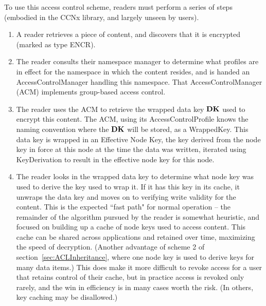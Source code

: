 To use this access control scheme, readers must perform a series of
steps (embodied in the CCNx library, and largely unseen by users).
\begin{enumerate}
\item A reader retrieves a piece of content, and discovers that it is encrypted (marked as type ENCR).

\item The reader consults their namespace manager to determine what
  profiles are in effect for the namespace in which the content
  resides, and is handed an AccessControlManager handling this
  namespace. That AccessControlManager (ACM) implements group-based
  access control.

\item The reader uses the ACM to retrieve the wrapped data key ${\textbf{DK}}$
  used to encrypt this content. The ACM, using its
  AccessControlProfile knows the naming convention where the ${\textbf{DK}}$
  will be stored, as a WrappedKey. This data key is wrapped in an
  Effective Node Key, the key derived from the node key in force at
  this node at the time the data was written, iterated using
  KeyDerivation to result in the effective node key for this node.

\item The reader looks in the wrapped data key to determine what node
  key was used to derive the key used to wrap it. If it has this key
  in its cache, it unwraps the data key and moves on to verifying
  write validity for the content. This is the expected ``fast path"
  for normal operation -- the remainder of the algorithm pursued by
  the reader is somewhat heuristic, and focused on building up a cache
  of node keys used to access content. This cache can be shared across
  applications and retained over time, maximizing the speed of
  decryption. (Another advantage of scheme 2 of
  section~\ref{sec:ACLInheritance}, where one node key is used to
  derive keys for many data items.) This does make it more difficult
  to revoke access for a user that retains control of their cache, but
  in practice access is revoked only rarely, and the win in efficiency
  is in many cases worth the risk. (In others, key caching may be
  disallowed.)


\end{enumerate}

